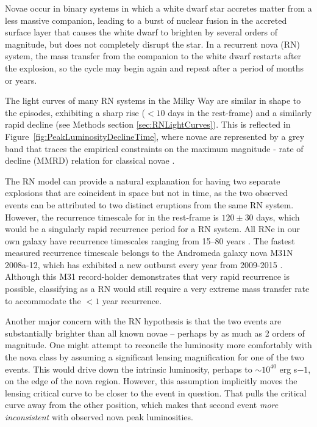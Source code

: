Novae occur in binary systems in which a white dwarf star accretes
matter from a less massive companion, leading to a burst of nuclear
fusion in the accreted surface layer that causes the white dwarf to
brighten by several orders of magnitude, but does not completely
disrupt the star. In a recurrent nova (RN) system, the mass transfer
from the companion to the white dwarf restarts after the explosion, so
the cycle may begin again and repeat after a period of months or
years.

The light curves of many RN systems in the Milky Way are similar in
shape to the \spock episodes, exhibiting a sharp rise ($<10$ days in
the rest-frame) and a similarly rapid decline (see Methods section
\ref{sec:RNLightCurves}).  This is reflected in
Figure~\ref{fig:PeakLuminosityDeclineTime}, where novae are
represented by a grey band that traces the empirical constraints on
the maximum magnitude - rate of decline (MMRD) relation for classical
novae \citep{DellaValle:1995, Downes:2000, Shafter:2011,
  Kasliwal:2011a}.

The RN model can provide a natural explanation for having two separate
explosions that are coincident in space but not in time, as the two
observed \spock events can be attributed to two distinct eruptions
from the same RN system.  However, the recurrence timescale for \spock
in the rest-frame is $120\pm30$ days, which would be a singularly
rapid recurrence period for a RN system.  All RNe in our own galaxy
have recurrence timescales ranging from 15--80 years
\citep{Schaefer:2010}.  The fastest measured recurrence timescale
belongs to the Andromeda galaxy nova M31N 2008a-12, which has
exhibited a new outburst every year from 2009-2015
\citep{Tang:2014,Darnley:2014,Darnley:2015,Henze:2015,Henze:2015a}. Although
this M31 record-holder demonstrates that very rapid recurrence is
possible, classifying \spock as a RN would still require a very
extreme mass transfer rate to accommodate the $<1$ year recurrence.

Another major concern with the RN hypothesis is that the
two \spock events are substantially brighter than all known novae --
perhaps by as much as 2 orders of magnitude.  One might attempt to
reconcile the \spock luminosity more comfortably with the nova class
by assuming a significant lensing magnification for one of the two
events. This would drive down the intrinsic luminosity, perhaps to
$\sim10^{40}$ erg s${-1}$, on the edge of the nova region.  However,
this assumption implicitly moves the lensing critical curve to be
closer to the \spock event in question.  That pulls the critical curve
away from the other \spock position, which makes that second event
{\it more inconsistent} with observed nova peak luminosities.  

